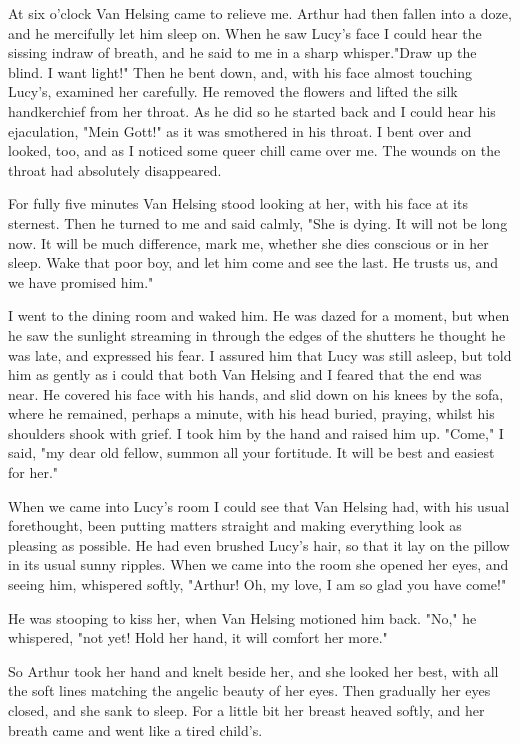 At six o'clock Van Helsing came to relieve me. Arthur had then fallen into a doze, and he mercifully let him sleep on. When he saw Lucy's face I could hear the sissing indraw of breath, and he said to me in a sharp whisper."Draw up the blind. I want light!" Then he bent down, and, with his face almost touching Lucy's, examined her carefully. He removed the flowers and lifted the silk handkerchief from her throat. As he did so he started back and I could hear his ejaculation, "Mein Gott!" as it was smothered in his throat. I bent over and looked, too, and as I noticed some queer chill came over me. The wounds on the throat had absolutely disappeared. 

For fully five minutes Van Helsing stood looking at her, with his face at its sternest. Then he turned to me and said calmly, "She is dying. It will not be long now. It will be much difference, mark me, whether she dies conscious or in her sleep. Wake that poor boy, and let him come and see the last. He trusts us, and we have promised him." 

I went to the dining room and waked him. He was dazed for a moment, but when he saw the sunlight streaming in through the edges of the shutters he thought he was late, and expressed his fear. I assured him that Lucy was still asleep, but told him as gently as i could that both Van Helsing and I feared that the end was near. He covered his face with his hands, and slid down on his knees by the sofa, where he remained, perhaps a minute, with his head buried, praying, whilst his shoulders shook with grief. I took him by the hand and raised him up. "Come," I said, "my dear old fellow, summon all your fortitude. It will be best and easiest for her." 

When we came into Lucy's room I could see that Van Helsing had, with his usual forethought, been putting matters straight and making everything look as pleasing as possible. He had even brushed Lucy's hair, so that it lay on the pillow in its usual sunny ripples. When we came into the room she opened her eyes, and seeing him, whispered softly, "Arthur! Oh, my love, I am so glad you have come!" 

He was stooping to kiss her, when Van Helsing motioned him back. "No," he whispered, "not yet! Hold her hand, it will comfort her more." 

So Arthur took her hand and knelt beside her, and she looked her best, with all the soft lines matching the angelic beauty of her eyes. Then gradually her eyes closed, and she sank to sleep. For a little bit her breast heaved softly, and her breath came and went like a tired child's. 

